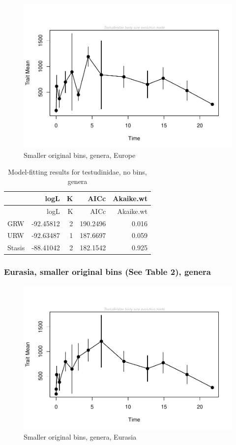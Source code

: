 \documentclass[]{article}
\begin{document}
\begin{figure}[htbp]
\centering
\includegraphics{MA_JJ_files/figure-latex/paleoTS with different time bins, no bins, genera, Europe-1.pdf}
\caption{Smaller original bins, genera, Europe}
\end{figure}

\begin{longtable}[]{@{}lrrrr@{}}
\caption{Model-fitting results for testudinidae, no bins,
genera}\tabularnewline
\toprule
& logL & K & AICc & Akaike.wt\tabularnewline
\midrule
\endfirsthead
\toprule
& logL & K & AICc & Akaike.wt\tabularnewline
\midrule
\endhead
GRW & -92.45812 & 2 & 190.2496 & 0.016\tabularnewline
URW & -92.63487 & 1 & 187.6697 & 0.059\tabularnewline
Stasis & -88.41042 & 2 & 182.1542 & 0.925\tabularnewline
\bottomrule
\end{longtable}

\newpage 

\subsubsection{Eurasia, smaller original bins (See Table 2),
genera}\label{eurasia-smaller-original-bins-see-table-2-genera}

\begin{figure}[htbp]
\centering
\includegraphics{MA_JJ_files/figure-latex/paleoTS with different time bins, no bins, genera, Eurasia-1.pdf}
\caption{Smaller original bins, genera, Eurasia}
\end{figure}
\end{document}
